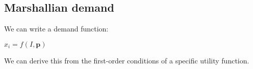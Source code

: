 
\subsection{Marshallian demand}

We can write a demand function:

\(x_i=f(I, \mathbf p)\)

We can derive this from the first-order conditions of a specific utility function.


